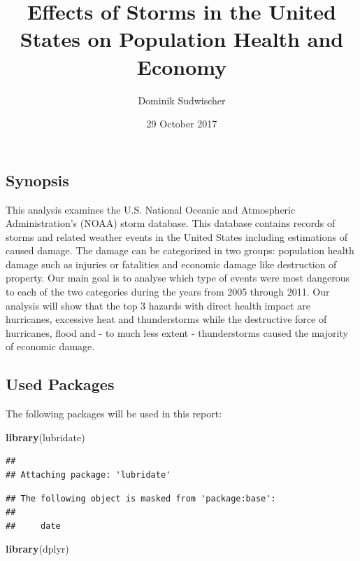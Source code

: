 \documentclass[]{article}
\title{Effects of Storms in the United States on Population Health and Economy}
\author{Dominik Sudwischer}
\date{29 October 2017}
\newenvironment{Shaded}{\begin{snugshade}}{\end{snugshade}}
\newcommand{\KeywordTok}[1]{\textcolor[rgb]{0.13,0.29,0.53}{\textbf{{#1}}}}
\newcommand{\NormalTok}[1]{{#1}}
\begin{document}
\maketitle

\subsection{Synopsis}\label{synopsis}

This analysis examines the U.S. National Oceanic and Atmospheric
Administration's (NOAA) storm database. This database contains records
of storms and related weather events in the United States including
estimations of caused damage. The damage can be categorized in two
groups: population health damage such as injuries or fatalities and
economic damage like destruction of property. Our main goal is to
analyse which type of events were most dangerous to each of the two
categories during the years from 2005 through 2011. Our analysis will
show that the top 3 hazards with direct health impact are hurricanes,
excessive heat and thunderstorms while the destructive force of
hurricanes, flood and - to much less extent - thunderstorms caused the
majority of economic damage.

\subsection{Used Packages}\label{used-packages}

The following packages will be used in this report:

\begin{Shaded}
\begin{Highlighting}[]
\KeywordTok{library}\NormalTok{(lubridate)}
\end{Highlighting}
\end{Shaded}

\begin{verbatim}
## 
## Attaching package: 'lubridate'
\end{verbatim}

\begin{verbatim}
## The following object is masked from 'package:base':
## 
##     date
\end{verbatim}

\begin{Shaded}
\begin{Highlighting}[]
\KeywordTok{library}\NormalTok{(dplyr)}
\end{Highlighting}
\end{Shaded}
\end{document}
